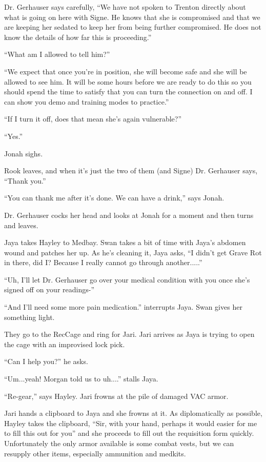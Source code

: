 Dr. Gerhauser says carefully, ``We have not spoken to Trenton directly about what is going on here with Signe.  He knows that she is compromised and that we are keeping her sedated to keep her from being further compromised.  He does not know the details of how far this is proceeding.''

``What am I allowed to tell him?''

``We expect that once you're in position, she will become safe and she will be allowed to see him.  It will be some hours before we are ready to do this so you should spend the time to satisfy that you can turn the connection on and off.  I can show you demo and training modes to practice.''

``If I turn it off, does that mean she's again vulnerable?''

``Yes.''

Jonah sighs.

Rook leaves, and when it's just the two of them (and Signe) Dr. Gerhauser says, ``Thank you.''

``You can thank me after it's done.  We can have a drink,'' says Jonah.

Dr. Gerhauser cocks her head and looks at Jonah for a moment and then turns and leaves.





Jaya takes Hayley to Medbay.  Swan takes a bit of time with Jaya's abdomen wound and patches her up.  As he's cleaning it, Jaya asks, ``I didn't get Grave Rot in there, did I?  Because I really cannot go through another.....''

``Uh, I'll let Dr. Gerhauser go over your medical condition with you once she's signed off on your readings-''

``And I'll need some more pain medication.'' interrupts Jaya.  Swan gives her something light.



They go to the RecCage and ring for Jari.  Jari arrives as Jaya is trying to open the cage with an improvised lock pick.  

``Can I help you?'' he asks.

``Um...yeah!  Morgan told us to uh....'' stalls Jaya.

``Re-gear,'' says Hayley.  Jari frowns at the pile of damaged VAC armor.

Jari hands a clipboard to Jaya and she frowns at it.   As diplomatically as possible, Hayley takes the clipboard, ``Sir, with your hand, perhaps it would easier for me to fill this out for you'' and she proceeds to fill out the requisition form quickly.  Unfortunately the only armor available is some combat vests, but we can resupply other items, especially ammunition and medkits.

